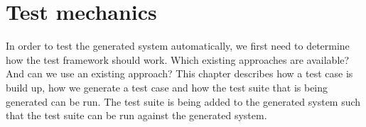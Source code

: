 \chapter{Test mechanics}
\label{cpt:3_testmechanics}
In order to test the generated system automatically, we first need to determine how the test framework should work. Which existing approaches are available? And can we use an existing approach? This chapter describes how a test case is build up, how we generate a test case and how the test suite that is being generated can be run. The test suite is being added to the generated system such that the test suite can be run against the generated system.

